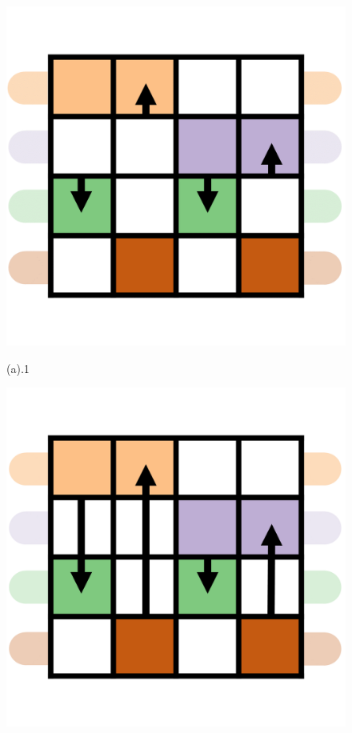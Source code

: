 \begin{figure}[h]
	\begin{minipage}{0.24\linewidth}
		\centerline{\includegraphics[width=\textwidth]{Fig/11.png}}
		\vspace{-1pt}
		\centerline{(a).1}
		\centerline{\includegraphics[width=\textwidth]{Fig/12.png}}

\end{minipage}
\end{figure}
